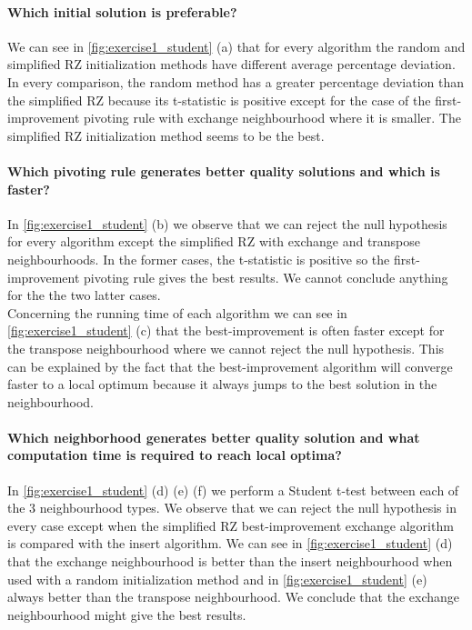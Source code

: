 \documentclass[a4paper,10pt]{article}
\begin{document}
\paragraph{Which initial solution is preferable?}

We can see in \ref{fig:exercise1_student} (a) that for every algorithm the random and simplified RZ initialization methods have different average percentage deviation. In every comparison, the random method has a greater percentage deviation than the simplified RZ because its t-statistic is positive except for the case of the first-improvement pivoting rule with exchange neighbourhood where it is smaller. The simplified RZ initialization method seems to be the best.

\paragraph{Which pivoting rule generates better quality solutions and which is faster?}

In \ref{fig:exercise1_student} (b) we observe that we can reject the null hypothesis for every algorithm except the simplified RZ with exchange and transpose neighbourhoods. In the former cases, the t-statistic is positive so the first-improvement pivoting rule gives the best results. We cannot conclude anything for the the two latter cases. \\

Concerning the running time of each algorithm we can see in \ref{fig:exercise1_student} (c) that the best-improvement is often faster except for the transpose neighbourhood where we cannot reject the null hypothesis. This can be explained by the fact that the best-improvement algorithm will converge faster to a local optimum because it always jumps to the best solution in the neighbourhood.

\paragraph{Which neighborhood generates better quality solution and what computation time is required to reach local optima?}

In \ref{fig:exercise1_student} (d) (e) (f) we perform a Student t-test between each of the 3 neighbourhood types. We observe that we can reject the null hypothesis in every case except when the simplified RZ best-improvement exchange algorithm is compared with the insert algorithm. We can see in \ref{fig:exercise1_student} (d) that the exchange neighbourhood is better than the insert neighbourhood when used with a random initialization method and in \ref{fig:exercise1_student} (e) always better than the transpose neighbourhood. We conclude that the exchange neighbourhood might give the best results.
\end{document}
